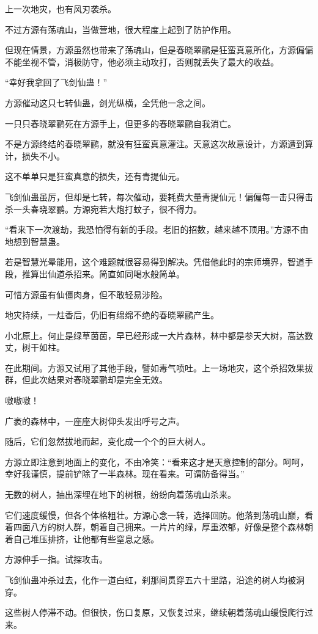 \begin{this_body}
上一次地灾，也有风刃袭杀。

不过方源有荡魂山，当做营地，很大程度上起到了防护作用。

但现在情景，方源虽然也带来了荡魂山，但是春晓翠鹂是狂蛮真意所化，方源偏偏不能坐视不管，消极防守，他必须主动攻打，否则就丢失了最大的收益。

“幸好我拿回了飞剑仙蛊！”

方源催动这只七转仙蛊，剑光纵横，全凭他一念之间。

一只只春晓翠鹂死在方源手上，但更多的春晓翠鹂自我消亡。

不是方源终结的春晓翠鹂，就没有狂蛮真意灌注。天意这次故意设计，方源遭到算计，损失不小。

这不单单只是狂蛮真意的损失，还有青提仙元。

飞剑仙蛊虽厉，但却是七转，每次催动，要耗费大量青提仙元！偏偏每一击只得击杀一头春晓翠鹂。方源宛若大炮打蚊子，很不得力。

“看来下一次渡劫，我恐怕得有新的手段。老旧的招数，越来越不顶用。”方源不由地想到智慧蛊。

若是智慧光晕能用，这个难题就很容易得到解决。凭借他此时的宗师境界，智道手段，推算出仙道杀招来。简直如同喝水般简单。

可惜方源虽有仙僵肉身，但不敢轻易涉险。

地灾持续，一炷香后，仍旧有绵绵不绝的春晓翠鹂产生。

小北原上。何止是绿草茵茵，早已经形成一大片森林，林中都是参天大树，高达数丈，树干如柱。

在此期间。方源又试用了其他手段，譬如毒气喷吐。上一场地灾，这个杀招效果拔群，但此次结果对春晓翠鹂却是完全无效。

嗷嗷嗷！

广袤的森林中，一座座大树仰头发出呼号之声。

随后，它们忽然拔地而起，变化成一个个的巨大树人。

方源立即注意到地面上的变化，不由冷笑：“看来这才是天意控制的部分。呵呵，幸好我谨慎，提前铲除了一半森林。现在看来。可谓防备得当。”

无数的树人，抽出深埋在地下的树根，纷纷向着荡魂山杀来。

它们速度缓慢，但各个体格粗壮。方源心念一转，选择回防。他落到荡魂山巅，看着四面八方的树人群，朝着自己拥来。一片片的绿，厚重浓郁，好像是整个森林朝着自己堆压排挤，让他都有些窒息之感。

方源伸手一指。试探攻击。

飞剑仙蛊冲杀过去，化作一道白虹，刹那间贯穿五六十里路，沿途的树人均被洞穿。

这些树人停滞不动。但很快，伤口复原，又恢复过来，继续朝着荡魂山缓慢爬行过来。


\end{this_body}
